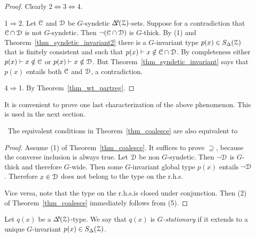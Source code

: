 \begin{proof}
  Clearly 2$\Leftrightarrow$3$\Leftrightarrow$4.

  1$\Rightarrow$2.
  Let $\EuScript C$ and $\EuScript D$ be $G$-syndetic $\BDelta({\Z})$-sets.
  Suppose for a contradiction that $\EuScript C\cap\EuScript D$ is not $G$-syndetic.
  Then $\neg(\EuScript C\cap\EuScript D)$ is $G$-thick.
  By (1) and Theorem~\ref{thm_syndetic_invariant2} there is a $G$-invariant type $p(x)\in S_\Delta(\EuScript Z)$ that is finitely consistent and such that $p(x)\vdash x\notin\EuScript C\cap\EuScript D$.
  By completeness either $p(x)\vdash x\notin\EuScript C$ or $p(x)\vdash x\notin\EuScript D$.
  But Theorem~\ref{thm_syndetic_invariant} says that $p(x)$ entails both $\EuScript C$ and $\EuScript D$, a contradiction.


  4$\Rightarrow$1. By Theorem~\ref{thm_wt_partreg}.
\end{proof}

It is convenient to prove one last characterization of the above phenomenon.
This is used in the next section. 

\begin{proposition}\label{prop_coalese}\ 
  The equivalent conditions in Theorem~\ref{thm_coalesce} are also equivalent to\smallskip

\end{proposition}

\begin{proof} 
  Assume (1) of Theorem~\ref{thm_coalesce}.
  It suffices to prove $\supseteq$, because the converse inclusion is always true. 
  Let $\EuScript D$ be non $G$-syndetic.
  Then $\neg\EuScript D$ is $G$-thick and therefore $G$-wide.
  Then some $G$-invariant global type $p(x)$ entails $\neg\EuScript D$.
  Therefore $x\in\EuScript D$ does not belong to the type on the r.h.s.
  
  Vice versa, note that the type on the r.h.s.\@ is closed under conjunction.
  Then (2) of Theorem~\ref{thm_coalesce} immediately follows from (5).
\end{proof}


Let $q(x)$ be a $\BDelta(\Z)$-type.
We say that $q(x)$ is \emph{$G$-stationary\/} if it extends to a unique $G$-in\-var\-iant $p(x)\in S_\Delta(\EuScript Z)$.

